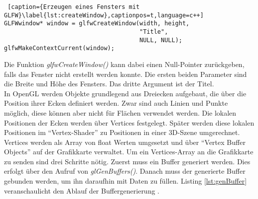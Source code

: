 \documentclass[11pt,a4paper]{article}
\begin{document}
\begin{lstlisting} [caption={Erzeugen eines Fensters mit GLFW}\label{lst:createWindow},captionpos=t,language=c++]
GLFWwindow* window = glfwCreateWindow(width, height,
                                      "Title",
                                      NULL, NULL);
glfwMakeContextCurrent(window);
\end{lstlisting}
\noindent
Die Funktion \mbox{\textit{glfwCreateWindow()}} kann dabei einen Null-Pointer zurückgeben, falls das Fenster nicht erstellt werden konnte. Die ersten beiden Parameter sind die Breite und Höhe des Fensters. Das dritte Argument ist der Titel.\\
In OpenGL werden Objekte grundlegend aus Dreiecken aufgebaut, die über die Position ihrer Ecken definiert werden. Zwar sind auch Linien  und Punkte möglich, diese können aber nicht für Flächen verwendet werden. Die lokalen Positionen der Ecken werden über Vertices festgelegt. Später werden diese lokalen Positionen im ``Vertex-Shader'' zu Positionen in einer 3D-Szene umgerechnet.\\
Vertices werden als Array von float Werten umgesetzt und über ``Vertex Buffer Objects'' auf der Grafikkarte verwaltet. Um ein Vertices-Array an die Grafikkarte zu senden sind drei Schritte nötig. Zuerst muss ein Buffer generiert werden. Dies erfolgt über den Aufruf von \mbox{\textit{glGenBuffers()}}. Danach muss der generierte Buffer gebunden werden, um ihn daraufhin mit Daten zu füllen. Listing \ref{lst:genBuffer} veranschaulicht den Ablauf der Buffergenerierung \cite[Hello-Triangle]{LearnOpenGL}.
\end{document}
